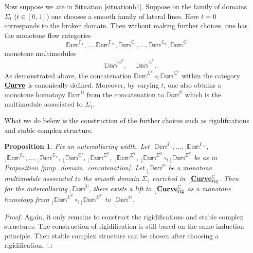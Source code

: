 \documentclass[reqno, 10pt]{amsart}
\numberwithin{equation}{section}
\numberwithin{equation}{section}
\newtheorem{prop}[thm]{Proposition}
\theoremstyle{definition}
\theoremstyle{remark}
\newcommand{\beqn}{\begin{equation*}}
\newcommand{\eeqn}{\end{equation*}}
\newcommand{\mb}{\mathbb}
\renewcommand{\outer}{{}_{\lfloor}}
\newcommand{\uds}[1]{\underline{\smash{#1}}}
\begin{document}
Now suppose we are in Situation \ref{situationh1}. Suppose on the family of domains $\Sigma_t$ ($t \in [0, 1]$) one chooses a smooth family of lateral lines. Here $t = 0$ corresponds to the broken domain. Then without making further choices, one has the monotone flow categories
\beqn
\mb{Dom}^{\mb{F}_1}, \ldots, \mb{Dom}^{\mb{F}_m}, \mb{Dom}^{{\mb G}_1}, \ldots, \mb{Dom}^{\mb{G}_n}, \mb{Dom}^{\mb{G}'}
\eeqn
monotone multimodules
\begin{align*}
&\ \mb{Dom}^{\Sigma^{\mb X}},\ &\ \mb{Dom}^{\Sigma^{\mb Y}}.
\end{align*}
As demonstrated above, the concatenation $\mb{Dom}^{\Sigma^{\mb X}} \circ_i \mb{Dom}^{\Sigma^{\mb Y}}$ within the category $\uds{\bf Curve}$ is canonically defined. Moreover, by varying $t$, one also obtains a monotone homotopy $\mb{Dom}^{\mb H}$ from the concatenation to $\mb{Dom}^{\mb{M}}$ which is the multimodule associated to $\Sigma_1$. 

What we do below is the construction of the further choices such as rigidifications and stable complex structure. 

\begin{prop}\label{prop_domain_gluing}
Fix an outercollaring width. Let $\outer \mb{Dom}^{\mb{F}_1}, \ldots, \outer \mb{Dom}^{\mb{F}_m}$, $\outer \mb{Dom}^{\mb{G}_1}, \ldots, \outer \mb{Dom}^{\mb{G}_n}$, $\outer \mb{Dom}^{\mb{G}'}$, $\outer \mb{Dom}^{\Sigma^{\mb X}}$, $\outer \mb{Dom}^{\Sigma^{\mb Y}}$, $\outer \mb{Dom}^{\Sigma^{\mb X}} \circ_i \outer \mb{Dom}^{\Sigma^{\mb Y}}$ be as in Proposition \ref{prop_domain_concatenation}. Let $\outer \mb{Dom}^{\mb{M}}$ be a monotone multimodule associated to the smooth domain $\Sigma_1$ enriched in $\outer \uds{\bf Curve}_{\rm rig}^{\mb C}$. Then for the outercollaring $\outer \mb{Dom}^{\mb H}$, there exists a lift to $\outer \uds{\bf Curve}_{\rm rig}^{\mb C}$ as a monotone homotopy from $\outer \mb{Dom}^{\Sigma^{\mb X}} \circ_i \outer \mb{Dom}^{\Sigma^{\mb Y}}$ to $\outer \mb{Dom}^{\mb{M}}$.
\end{prop}

\begin{proof}
Again, it only remains to construct the rigidifications and stable complex structures. The construction of rigidification is still based on the same induction principle. Then stable complex structure can be chosen after choosing a rigidification.
\end{proof}
\end{document}
